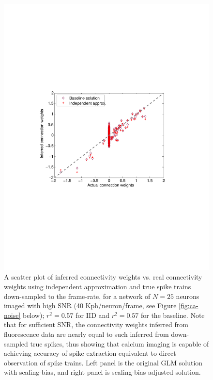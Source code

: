 \begin{figure}
\begin{minipage}[c]{0.45\hsize}
\includegraphics[width=\hsize]{../figs/Figure2b_fluor_base_vs_iid}
\end{minipage}
\caption{A scatter plot of inferred connectivity weights vs. real connectivity weights
using independent approximation and true spike trains down-sampled to the frame-rate,
for a network of $N=25$ neurons imaged
with high SNR (40 Kph/neuron/frame, see Figure \ref{fig:ca-noise} below); $r^2=0.57$ for IID and $r^2=0.57$ for the baseline. Note that for sufficient SNR, the connectivity weights inferred from fluorescence data are nearly equal to such inferred from down-sampled true spikes, thus showing that calcium imaging is capable of achieving accuracy of spike extraction equivalent to direct observation of spike trains.
Left panel is the original GLM solution with scaling-bias, and right panel is scaling-bias adjusted solution.}
\label{fig:iid-base}
\end{figure}

